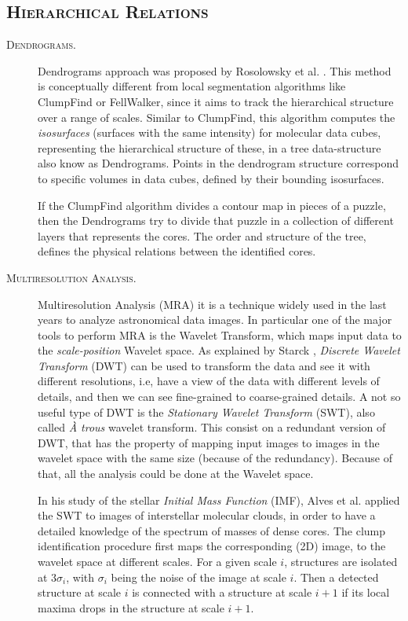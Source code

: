 \documentclass[letter, 11pt]{article}
\begin{document}
\begin{description}
\end{description}


\subsection{\textsc{Hierarchical Relations}}

\begin{description}
    \item[\textsc{Dendrograms.}] Dendrograms approach was proposed by Rosolowsky et al. \cite{Rosolowsky}. This method is conceptually different from local segmentation algorithms like ClumpFind or FellWalker, since it aims to track the hierarchical structure over a range of scales. Similar to ClumpFind, this algorithm computes the \textit{isosurfaces} (surfaces with the same intensity) for molecular data cubes, representing the hierarchical structure of these, in a tree data-structure also know as Dendrograms. Points in the dendrogram structure correspond to specific volumes in data cubes, defined by their bounding isosurfaces.

    If the ClumpFind algorithm divides a contour map in pieces of a puzzle, then the Dendrograms try to divide that puzzle in a collection of different layers that represents the cores. The order and structure of the tree, defines the physical relations between the identified cores.

    \item[\textsc{Multiresolution Analysis.}] Multiresolution Analysis (MRA) it is a technique widely used in the last years to analyze astronomical data images. In particular one of the major tools to perform MRA is the Wavelet Transform, which maps input data to the \textit{scale-position} Wavelet space. As explained by Starck \cite{Starck}, \textit{Discrete Wavelet Transform} (DWT) can be used to transform the data and see it with different resolutions, i.e, have a view of the data with different levels of details, and then we can see fine-grained to coarse-grained details. A not so useful type of DWT is the \textit{Stationary Wavelet Transform} (SWT), also called \textit{À trous} wavelet transform. This consist on a redundant version of DWT, that has the property of mapping input images to images in the wavelet space with the same size (because of the redundancy). Because of that, all the analysis could be done at the Wavelet space.

    In his study of the stellar \textit{Initial Mass Function} (IMF), Alves et al. \cite{Alves} applied the SWT to images of interstellar molecular clouds, in order to have a detailed knowledge of the spectrum of masses of dense cores. The clump identification procedure first maps the corresponding (2D) image, to the wavelet space at different scales. For a given scale $i$, structures are isolated at $3\sigma_i$, with $\sigma_i$ being the noise of the image at scale $i$. Then a detected structure at scale $i$ is connected with a structure at scale $i+1$ if its local maxima drops in the structure at scale $i+1$.


\end{description}
\end{document}
